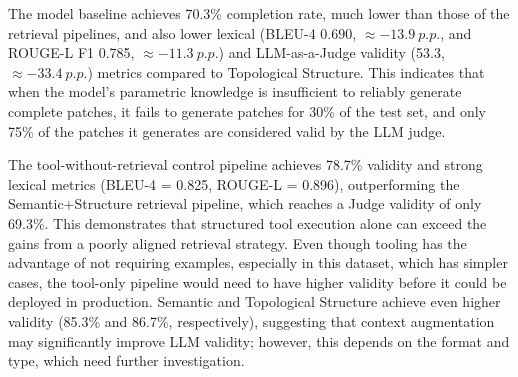\begin{table}[H]
  \centering
  \caption{GPT-5.3-Codex: Overall pipeline performance on the AutoPatch dataset}
  \label{tab:autopatch_overall_pipeline_performance_gpt_codex}
\end{table}
The model baseline achieves 70.3\% completion rate, much lower than those of the retrieval pipelines, and also lower lexical (BLEU-4 $0.690$, $\approx-13.9~p.p.$, and ROUGE-L F1 0.785, $\approx-11.3~p.p.$) and LLM-as-a-Judge validity (53.3, $\approx-33.4~p.p.$) metrics compared to Topological Structure. 
This indicates that when the model's parametric knowledge is insufficient to reliably generate complete patches, it fails to generate patches for 30\% of the test set, and only 75\% of the patches it generates are considered valid by the LLM judge. 

The tool-without-retrieval control pipeline achieves 78.7\% validity and strong lexical metrics (BLEU-4 = 0.825, ROUGE-L = 0.896), outperforming the Semantic+Structure retrieval pipeline, which reaches a Judge validity of only 69.3\%. This demonstrates that structured tool execution alone can exceed the gains from a poorly aligned retrieval strategy. Even though tooling has the advantage of not requiring examples, especially in this dataset, which has simpler cases, the tool-only pipeline would need to have higher validity before it could be deployed in production. Semantic and Topological Structure achieve even higher validity (85.3\% and 86.7\%, respectively), suggesting that context augmentation may significantly improve LLM validity; however, this depends on the format and type, which need further investigation.

